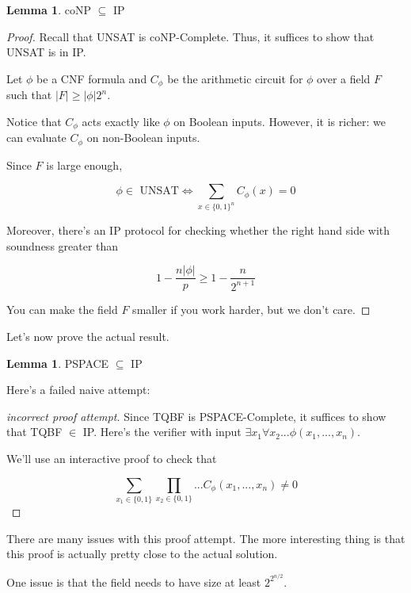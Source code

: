 \documentclass{article}
\theoremstyle{definition}
\newtheorem{lemma}[theorem]{Lemma}
\begin{document}
\begin{lemma}\label{conp_is_contained_in_ip}
    coNP $\subseteq$ IP
\end{lemma}
\begin{proof}
    Recall that UNSAT is coNP-Complete. Thus, it suffices to show that UNSAT is in IP.

    Let $\phi$ be a CNF formula and $C_{\phi}$ be the arithmetic circuit for $\phi$ over a field $F$ such that $\lvert F \rvert \geq \lvert \phi \rvert 2^{n}$. 

    Notice that $C_{\phi}$ acts exactly like $\phi$ on Boolean inputs. However, it is richer: we can evaluate $C_{\phi}$ on non-Boolean inputs.

    Since $F$ is large enough, 

    \[ \phi \in \text{ UNSAT} \iff \sum_{x \in \{0,1\}^{n}} C_{\phi}(x) = 0\]

    Moreover, there's an IP protocol for checking whether the right hand side with soundness greater than 

    \[ 1 - \frac{n \lvert \phi \rvert}{p} \geq 1 - \frac{n}{2^{n+1}}\]

    You can make the field $F$ smaller if you work harder, but we don't care.
\end{proof}

\newpage

Let's now prove the actual result.

\begin{lemma}\label{pspace_is_contained_in_ip}
    PSPACE $\subseteq$ IP
\end{lemma}

Here's a failed naive attempt:

\begin{proof}[incorrect proof attempt]
    Since TQBF is PSPACE-Complete, it suffices to show that TQBF $\in$ IP.  Here's the verifier with input $\exists x_{1} \forall x_{2} ... \phi(x_{1},...,x_{n})$.

    We'll use an interactive proof to check that

    \[ \sum_{x_{1} \in \{0,1\}} \prod_{x_{2} \in \{0,1\}} ... C_{\phi}(x_{1},...,x_{n}) \neq 0\]
\end{proof}

There are many issues with this proof attempt. The more interesting thing is that this proof is actually pretty close to the actual solution.

One issue is that the field needs to have size at least $2^{2^{n/2}}$.
\end{document}

